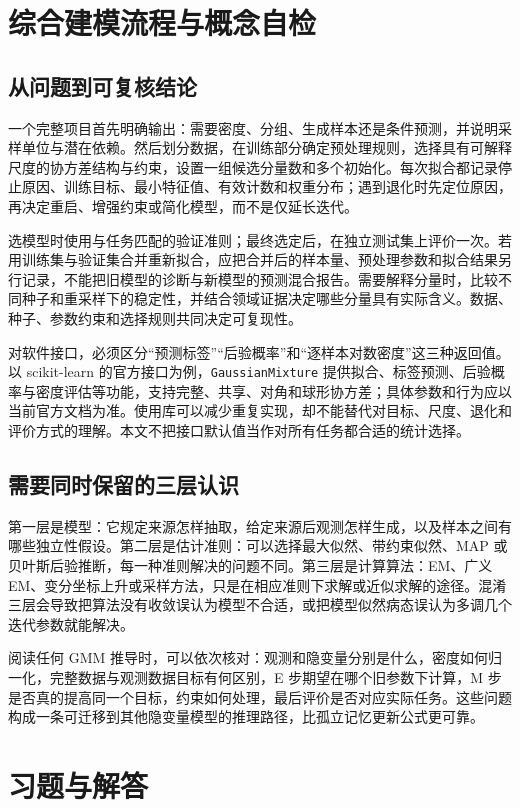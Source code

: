 \documentclass[UTF8,12pt,a4paper,fontset=fandol]{ctexart}
\begin{document}
\section{综合建模流程与概念自检}
\label{sec:gmm-workflow}

\subsection{从问题到可复核结论}
一个完整项目首先明确输出：需要密度、分组、生成样本还是条件预测，并说明采样单位与潜在依赖。然后划分数据，在训练部分确定预处理规则，选择具有可解释尺度的协方差结构与约束，设置一组候选分量数和多个初始化。每次拟合都记录停止原因、训练目标、最小特征值、有效计数和权重分布；遇到退化时先定位原因，再决定重启、增强约束或简化模型，而不是仅延长迭代。

选模型时使用与任务匹配的验证准则；最终选定后，在独立测试集上评价一次。若用训练集与验证集合并重新拟合，应把合并后的样本量、预处理参数和拟合结果另行记录，不能把旧模型的诊断与新模型的预测混合报告。需要解释分量时，比较不同种子和重采样下的稳定性，并结合领域证据决定哪些分量具有实际含义。数据、种子、参数约束和选择规则共同决定可复现性。

对软件接口，必须区分“预测标签”“后验概率”和“逐样本对数密度”这三种返回值。以 scikit-learn 的官方接口为例，\texttt{GaussianMixture} 提供拟合、标签预测、后验概率与密度评估等功能，支持完整、共享、对角和球形协方差；具体参数和行为应以当前官方文档为准\cite{sklearn-gmm}。使用库可以减少重复实现，却不能替代对目标、尺度、退化和评价方式的理解。本文不把接口默认值当作对所有任务都合适的统计选择。

\subsection{需要同时保留的三层认识}
第一层是模型：它规定来源怎样抽取，给定来源后观测怎样生成，以及样本之间有哪些独立性假设。第二层是估计准则：可以选择最大似然、带约束似然、MAP 或贝叶斯后验推断，每一种准则解决的问题不同。第三层是计算算法：EM、广义 EM、变分坐标上升或采样方法，只是在相应准则下求解或近似求解的途径。混淆三层会导致把算法没有收敛误认为模型不合适，或把模型似然病态误认为多调几个迭代参数就能解决。

阅读任何 GMM 推导时，可以依次核对：观测和隐变量分别是什么，密度如何归一化，完整数据与观测数据目标有何区别，E 步期望在哪个旧参数下计算，M 步是否真的提高同一个目标，约束如何处理，最后评价是否对应实际任务。这些问题构成一条可迁移到其他隐变量模型的推理路径，比孤立记忆更新公式更可靠。

\section{习题与解答}
\label{sec:gmm-exercises}
\end{document}
